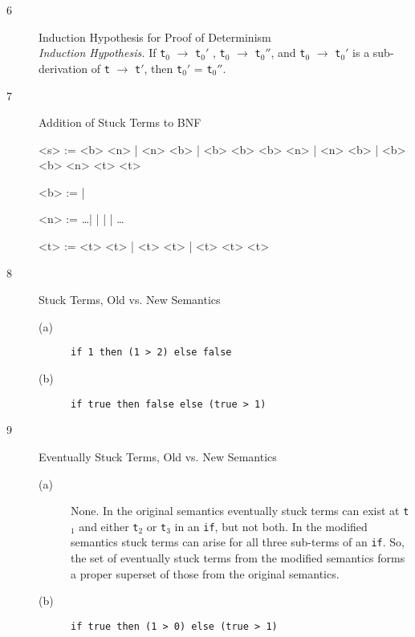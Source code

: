 \documentclass{article}
\begin{document}
\begin{description}
  \item[6]{Induction Hypothesis for Proof of Determinism}
    \vspace{0.3cm}\\
    \textit{Induction Hypothesis.} If \verb|t|$_0$ $\longrightarrow$ \verb|t|$_0'$ , \verb|t|$_0$ $\longrightarrow$ \verb|t|$_0''$, and \verb|t|$_0$ $\longrightarrow$ \verb|t|$_0'$ is a sub-derivation of \verb|t| $\longrightarrow$ \verb|t|$'$, then \verb|t|$_0'$ = \verb|t|$_0''$.

  \item[7]{Addition of Stuck Terms to BNF}

    \begin{grammar}
      <s> :=  <b>  \lit*{+} <n> | <n> \lit*{+} <b> | <b> \lit*{+} <b>
      \alt <b>  \lit*{>} <n> | <n> \lit*{>} <b> | <b> \lit*{>} <b>
      \alt {} <n>  <t>  <t>

      <b> :=  | 

      <n> := \ldots |  |  |  | \ldots

      <t> := <t> \lit*{+} <t> | <t> \lit*{>} <t> |  <t>  <t>  <t>
    \end{grammar}

  \item[8]{Stuck Terms, Old vs. New Semantics}
    \begin{description}
      \item[(a)] \verb|if 1 then (1 > 2) else false|
      \item[(b)] \verb|if true then false else (true > 1)|
    \end{description}

  \item[9]{Eventually Stuck Terms, Old vs. New Semantics}
    \begin{description}
      \item[(a)] None. In the original semantics eventually stuck terms can exist at \verb|t|$_1$ and either \verb|t|$_2$ or \verb|t|$_3$ in an \verb|if|, but not both. In the modified semantics stuck terms can arise for all three sub-terms of an \verb|if|. So, the set of eventually stuck terms from the modified semantics forms a proper superset of those from the original semantics.
      \item[(b)] \verb|if true then (1 > 0) else (true > 1)|
    \end{description}


\end{description}
\end{document}
